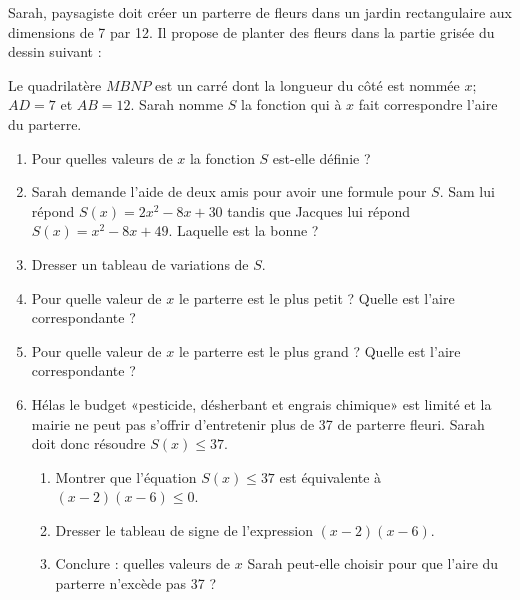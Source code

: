 
\begin{exercice}\label{exosmath-0719}

    \begin{multicols}{2}

    Sarah, paysagiste doit créer un parterre de fleurs dans un jardin rectangulaire aux dimensions de \unit{7}{\meter} par \unit{12}{\meter}. Il propose de planter des fleurs dans la partie grisée du dessin suivant :

\begin{center}
   
\end{center}

Le quadrilatère \( MBNP\) est un carré dont la longueur du côté est nommée \( x\); \( AD=7\) et \( AB=12\). Sarah nomme \( S\) la fonction qui à \( x\) fait correspondre l'aire du parterre.

\begin{enumerate}
    \item
        Pour quelles valeurs de \( x\) la fonction \( S\) est-elle définie ?
    \item
        Sarah demande l'aide de deux amis pour avoir une formule pour \( S\). Sam lui répond \( S(x)=2x^2-8x+30\) tandis que Jacques lui répond \( S(x)=x^2-8x+49\). Laquelle est la bonne ?
            \item
                Dresser un tableau de variations de \( S\).
            \item
                Pour quelle valeur de \( x\) le parterre est le plus petit ? Quelle est l'aire correspondante ?
            \item
                Pour quelle valeur de \( x\) le parterre est le plus grand ? Quelle est l'aire correspondante ?
    \item
        Hélas le budget «pesticide, désherbant et engrais chimique» est limité et la mairie ne peut pas s'offrir d'entretenir plus de \unit{37}{\squared\meter} de parterre fleuri. Sarah doit donc résoudre \( S(x)\leq 37\).
        \begin{enumerate}
            \item
                Montrer que l'équation \( S(x)\leq 37\) est équivalente à \( (x-2)(x-6)\leq 0\).
            \item
                Dresser le tableau de signe de l'expression \( (x-2)(x-6)\).
            \item
                Conclure : quelles valeurs de \( x\) Sarah peut-elle choisir pour que l'aire du parterre n'excède pas \unit{37}{\squared\meter} ?
        \end{enumerate}
\end{enumerate}
    \end{multicols}


\end{exercice}
